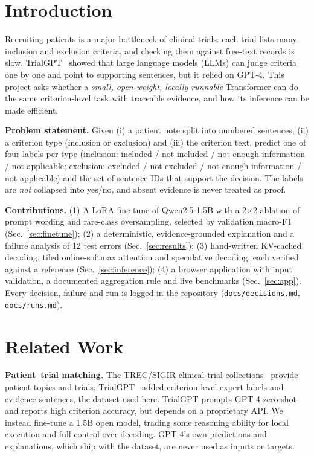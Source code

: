 \documentclass[conference]{IEEEtran}
\begin{document}
\section{Introduction}
Recruiting patients is a major bottleneck of clinical trials: each trial lists many inclusion and exclusion criteria, and checking them against free-text records is slow. TrialGPT~\cite{trialgpt} showed that large language models (LLMs) can judge criteria one by one and point to supporting sentences, but it relied on GPT-4. This project asks whether a \emph{small, open-weight, locally runnable} Transformer can do the same criterion-level task with traceable evidence, and how its inference can be made efficient.

\textbf{Problem statement.} Given (i) a patient note split into numbered sentences, (ii) a criterion type (inclusion or exclusion) and (iii) the criterion text, predict one of four labels per type (inclusion: included / not included / not enough information / not applicable; exclusion: excluded / not excluded / not enough information / not applicable) and the set of sentence IDs that support the decision. The labels are \emph{not} collapsed into yes/no, and absent evidence is never treated as proof.

\textbf{Contributions.} (1) A LoRA fine-tune of Qwen2.5-1.5B with a 2$\times$2 ablation of prompt wording and rare-class oversampling, selected by validation macro-F1 (Sec.~\ref{sec:finetune}); (2) a deterministic, evidence-grounded explanation and a failure analysis of 12 test errors (Sec.~\ref{sec:results}); (3) hand-written KV-cached decoding, tiled online-softmax attention and speculative decoding, each verified against a reference (Sec.~\ref{sec:inference}); (4) a browser application with input validation, a documented aggregation rule and live benchmarks (Sec.~\ref{sec:app}). Every decision, failure and run is logged in the repository (\texttt{docs/decisions.md}, \texttt{docs/runs.md}).

\section{Related Work}
\textbf{Patient--trial matching.} The TREC/SIGIR clinical-trial collections~\cite{koopman} provide patient topics and trials; TrialGPT~\cite{trialgpt} added criterion-level expert labels and evidence sentences, the dataset used here. TrialGPT prompts GPT-4 zero-shot and reports high criterion accuracy, but depends on a proprietary API. We instead fine-tune a 1.5B open model, trading some reasoning ability for local execution and full control over decoding. GPT-4's own predictions and explanations, which ship with the dataset, are never used as inputs or targets.
\end{document}
